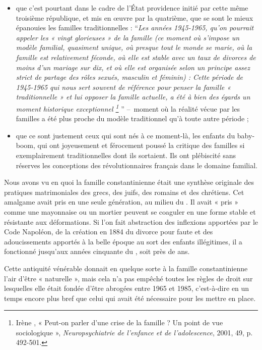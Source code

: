 \begin{itemize}
\item que c'est pourtant dans le cadre de l'État providence initié par cette même troisième république, et mis en œuvre par la quatrième, que se sont le mieux épanouies les familles traditionnelles : \enquote{\emph{Les années 1945-1965, qu'on pourrait appeler les « vingt glorieuses » de la famille (ce moment où s'impose un modèle familial, quasiment unique, où presque tout le monde se marie, où la famille est relativement féconde, où elle est stable avec un taux de divorces de moins d'un mariage sur dix, et où elle est organisée selon un principe assez strict de partage des rôles sexués, masculin et féminin) : Cette période de 1945-1965 qui nous sert souvent de référence pour penser la famille « traditionnelle » et lui opposer la famille actuelle, a été à bien des égards un moment historique exceptionnel%
\footnote{Irène , « Peut-on parler d'une crise de la famille ? Un point de vue sociologique », \emph{Neuropsychiatrie de l'enfance et de l'adolescence}, 2001, 49, p. 492-501.}%
}} \mbox{-- }moment où la réalité vécue par les familles a été plus proche du modèle traditionnel qu'à toute autre période ;

\item que ce sont justement ceux qui sont nés à ce moment-là, les enfants du baby-boom, qui ont joyeusement et férocement poussé la critique des familles si exemplairement traditionnelles dont ils sortaient. Ils ont plébiscité sans réserves les conceptions des révolutionnaires français dans le domaine familial.
 
\end{itemize}
 
 Nous avons vu en quoi la famille constantinienne était une synthèse originale des pratiques matrimoniales des grecs, des juifs, des romains et des chrétiens. Cet amalgame avait pris en une seule génération, au milieu du . Il avait « pris » comme une mayonnaise ou un mortier peuvent se coaguler en une forme stable et résistante aux déformations.  Si l'on fait abstraction des inflexions apportées par le Code Napoléon, de la création en 1884 du divorce pour faute et des adoucissements apportés à la belle époque au sort des enfants illégitimes, il a fonctionné jusqu'aux années cinquante du , soit près de  ans. 
 
 Cette antiquité vénérable donnait en quelque sorte à la famille constantinienne l'air d'être « naturelle », mais cela n'a pas empêché toutes les règles de droit sur lesquelles elle était fondée d'être abrogées entre 1965 et 1985, c'est-à-dire en un temps encore plus bref que celui qui avait été nécessaire pour les mettre en place. 
 

